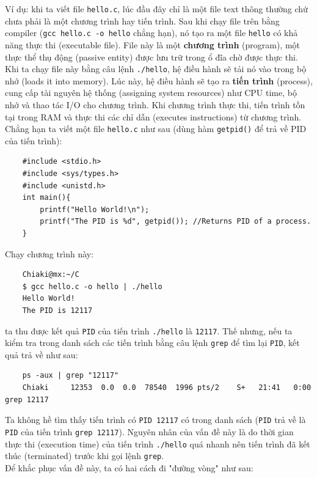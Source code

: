 \documentclass{article}
\begin{document}
Ví dụ: khi ta viết file \verb|hello.c|, lúc đầu đây chỉ là một file text thông thường chứ chưa phải là một chương trình hay tiến trình. Sau khi chạy file trên bằng compiler (\verb|gcc hello.c -o hello| chẳng hạn),
nó tạo ra một file \verb|hello| có khả năng thực thi (executable file). File này là một \textbf{chương trình} (program), một thực thể thụ động (passive entity) được lưu trữ trong ổ đĩa chờ được thực thi. Khi ta
chạy file này bằng câu lệnh \verb|./hello|, hệ điều hành sẽ tải nó vào trong bộ  nhớ (loads it into memory). Lúc này, hệ điều hành sẽ tạo ra \textbf{tiến trình} (process), cung cấp tài nguyên hệ thống (assigning system resources) như CPU time, bộ nhớ và thao tác I/O cho chương trình. 
Khi chương trình thực thi, tiến trình tồn tại trong RAM và thực thi các chỉ dẫn (executes instructions) từ chương trình. 
\\ Chẳng hạn ta viết một file \verb|hello.c| như sau (dùng hàm \verb|getpid()| để trả về PID của tiến trình):
\begin{verbatim}
    #include <stdio.h>
    #include <sys/types.h>
    #include <unistd.h>
    int main(){
        printf("Hello World!\n");
        printf("The PID is %d", getpid()); //Returns PID of a process.
    }    
\end{verbatim}
Chạy chương trình này:
\begin{verbatim}
    Chiaki@mx:~/C
    $ gcc hello.c -o hello | ./hello
    Hello World!
    The PID is 12117
\end{verbatim}
ta thu được kết quả \verb|PID| của tiến trình \verb|./hello| là \verb|12117|. Thế nhưng, nếu ta kiểm tra trong danh sách các tiến trình bằng câu lệnh \verb|grep| để tìm lại \verb|PID|, kết  quả trả về như sau:
\begin{verbatim}
    ps -aux | grep "12117"
    Chiaki     12353  0.0  0.0  78540  1996 pts/2    S+   21:41   0:00 grep 12117
\end{verbatim}
Ta không hề tìm thấy tiến trình có \verb|PID 12117| có trong danh sách (\verb|PID| trả về là \verb|PID| của tiến trình \verb|grep 12117|). Nguyên nhân của vấn đề này là do thời gian
thực thi (execution time) của tiến trình \verb|./hello| quá nhanh nên tiến trình đã kết thúc (terminated) trước khi gọi lệnh \verb|grep|.
\\ Để khắc phục vấn đề này, ta có hai cách đi "đường vòng" như sau:
\end{document}
